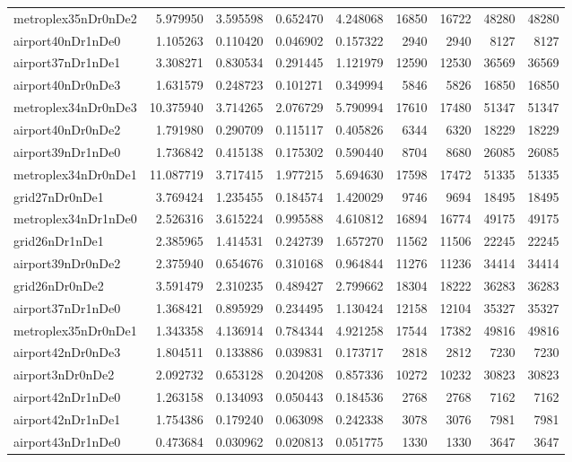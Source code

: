\begin{longtable}{|l|r|r|r|r|r|r|r|r|}
metroplex35nDr0nDe2 & 5.979950 & 3.595598 & 0.652470 & 4.248068 & 16850 & 16722 & 48280 & 48280 \\
airport40nDr1nDe0 & 1.105263 & 0.110420 & 0.046902 & 0.157322 & 2940 & 2940 & 8127 & 8127 \\
airport37nDr1nDe1 & 3.308271 & 0.830534 & 0.291445 & 1.121979 & 12590 & 12530 & 36569 & 36569 \\
airport40nDr0nDe3 & 1.631579 & 0.248723 & 0.101271 & 0.349994 & 5846 & 5826 & 16850 & 16850 \\
metroplex34nDr0nDe3 & 10.375940 & 3.714265 & 2.076729 & 5.790994 & 17610 & 17480 & 51347 & 51347 \\
airport40nDr0nDe2 & 1.791980 & 0.290709 & 0.115117 & 0.405826 & 6344 & 6320 & 18229 & 18229 \\
airport39nDr1nDe0 & 1.736842 & 0.415138 & 0.175302 & 0.590440 & 8704 & 8680 & 26085 & 26085 \\
metroplex34nDr0nDe1 & 11.087719 & 3.717415 & 1.977215 & 5.694630 & 17598 & 17472 & 51335 & 51335 \\
grid27nDr0nDe1 & 3.769424 & 1.235455 & 0.184574 & 1.420029 & 9746 & 9694 & 18495 & 18495 \\
metroplex34nDr1nDe0 & 2.526316 & 3.615224 & 0.995588 & 4.610812 & 16894 & 16774 & 49175 & 49175 \\
grid26nDr1nDe1 & 2.385965 & 1.414531 & 0.242739 & 1.657270 & 11562 & 11506 & 22245 & 22245 \\
airport39nDr0nDe2 & 2.375940 & 0.654676 & 0.310168 & 0.964844 & 11276 & 11236 & 34414 & 34414 \\
grid26nDr0nDe2 & 3.591479 & 2.310235 & 0.489427 & 2.799662 & 18304 & 18222 & 36283 & 36283 \\
airport37nDr1nDe0 & 1.368421 & 0.895929 & 0.234495 & 1.130424 & 12158 & 12104 & 35327 & 35327 \\
metroplex35nDr0nDe1 & 1.343358 & 4.136914 & 0.784344 & 4.921258 & 17544 & 17382 & 49816 & 49816 \\
airport42nDr0nDe3 & 1.804511 & 0.133886 & 0.039831 & 0.173717 & 2818 & 2812 & 7230 & 7230 \\
airport3nDr0nDe2 & 2.092732 & 0.653128 & 0.204208 & 0.857336 & 10272 & 10232 & 30823 & 30823 \\
airport42nDr1nDe0 & 1.263158 & 0.134093 & 0.050443 & 0.184536 & 2768 & 2768 & 7162 & 7162 \\
airport42nDr1nDe1 & 1.754386 & 0.179240 & 0.063098 & 0.242338 & 3078 & 3076 & 7981 & 7981 \\
airport43nDr1nDe0 & 0.473684 & 0.030962 & 0.020813 & 0.051775 & 1330 & 1330 & 3647 & 3647 \\

\end{longtable}
